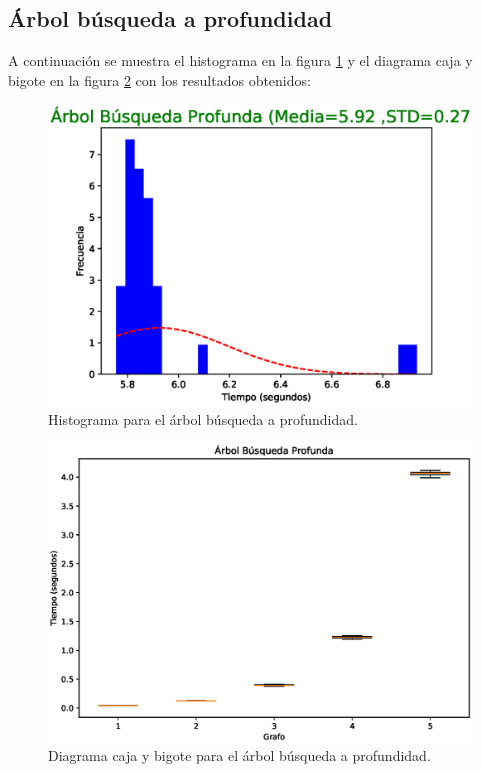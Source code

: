 \documentclass{article}
\begin{document}
\subsection{Árbol búsqueda a profundidad}
A continuación se muestra el histograma en la figura \ref{fig:H2} y el diagrama caja y bigote en la figura \ref{fig:BP2} con los resultados obtenidos:
\begin{figure}[H]
    \includegraphics[width=\textwidth]{H2}
    \caption{Histograma para el árbol búsqueda a profundidad.}
    \label{fig:H2}
\end{figure}
\begin{figure}[H]
    \includegraphics[width=\textwidth]{BP2}
    \caption{Diagrama caja y bigote para el árbol búsqueda a profundidad.}
    \label{fig:BP2}
\end{figure}
\end{document}
